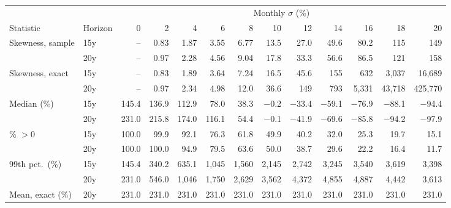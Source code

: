 \begin{tabular}{@{}llrrrrrrrrrrr@{}}
\toprule
 & & \multicolumn{11}{c}{Monthly $\sigma$ (\%)} \\ \cmidrule(l){3-13}
Statistic & Horizon & 0 & 2 & 4 & 6 & 8 & 10 & 12 & 14 & 16 & 18 & 20 \\ \midrule
Skewness, sample & 15y & -- & 0.83 & 1.87 & 3.55 & 6.77 & 13.5 & 27.0 & 49.6 & 80.2 & 115 & 149 \\
 & 20y & -- & 0.97 & 2.28 & 4.56 & 9.04 & 17.8 & 33.3 & 56.6 & 86.5 & 121 & 158 \\
\addlinespace
Skewness, exact & 15y & -- & 0.83 & 1.89 & 3.64 & 7.24 & 16.5 & 45.6 & 155 & 632 & 3,037 & 16,689 \\
 & 20y & -- & 0.97 & 2.34 & 4.98 & 12.0 & 36.6 & 149 & 793 & 5,331 & 43,718 & 425,770 \\
\addlinespace
Median (\%) & 15y & 145.4 & 136.9 & 112.9 & 78.0 & 38.3 & $-$0.2 & $-$33.4 & $-$59.1 & $-$76.9 & $-$88.1 & $-$94.4 \\
 & 20y & 231.0 & 215.8 & 174.0 & 116.1 & 54.4 & $-$0.1 & $-$41.9 & $-$69.6 & $-$85.8 & $-$94.2 & $-$97.9 \\
\addlinespace
\% $>0$ & 15y & 100.0 & 99.9 & 92.1 & 76.3 & 61.8 & 49.9 & 40.2 & 32.0 & 25.3 & 19.7 & 15.1 \\
 & 20y & 100.0 & 100.0 & 94.9 & 79.5 & 63.6 & 50.0 & 38.7 & 29.6 & 22.2 & 16.4 & 11.7 \\
\addlinespace
99th pct.\ (\%) & 15y & 145.4 & 340.2 & 635.1 & 1,045 & 1,560 & 2,145 & 2,742 & 3,245 & 3,540 & 3,619 & 3,398 \\
 & 20y & 231.0 & 546.0 & 1,046 & 1,750 & 2,629 & 3,562 & 4,372 & 4,855 & 4,887 & 4,442 & 3,613 \\
\addlinespace
Mean, exact (\%) & 20y & 231.0 & 231.0 & 231.0 & 231.0 & 231.0 & 231.0 & 231.0 & 231.0 & 231.0 & 231.0 & 231.0 \\
\bottomrule
\end{tabular}
